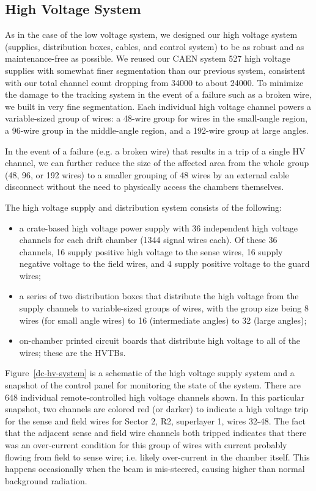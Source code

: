 \subsection{High Voltage System}

As in the case of the low voltage system, we designed our high voltage system
(supplies, distribution boxes, cables, and control system) to be as robust and 
as maintenance-free as possible.  
We reused our CAEN 
system 527 high voltage supplies with somewhat finer segmentation than our 
previous system, consistent with our total channel count dropping from 34000 
to about 24000.
To minimize the damage to the tracking system in the event of a failure such as
a broken wire, we built in very fine segmentation.
Each individual high voltage channel powers a variable-sized group of 
wires: a 48-wire group for wires in the small-angle region, a 96-wire group
in the middle-angle region, and a 192-wire group at large angles.

In the event of a failure (e.g. a broken wire) that results in a trip
of a single HV channel, we can further reduce the size of the affected
area from the whole group (48, 96, or 192 wires) to a smaller grouping
of 48 wires by an external cable disconnect without the need to 
physically access the chambers themselves.

The high voltage supply and distribution system consists of the following:
\begin{itemize}
\item a crate-based high voltage power supply with 36 independent
high voltage channels for each drift chamber (1344 signal wires each).
Of these 36 channels, 16 supply positive high voltage to the sense
wires, 16 supply negative voltage to the field wires, and 4 supply
positive voltage to the guard wires;
\item a series of two distribution boxes that distribute the high
voltage from the supply channels to variable-sized groups
of wires, with the group size being 8 wires (for small angle wires)
to 16 (intermediate angles) to 32 (large angles);
\item  on-chamber printed circuit boards that distribute high voltage
to all of the wires; these are the HVTBs.
\end{itemize}

Figure~\ref{dc-hv-system} is a schematic of the high voltage
supply system and a snapshot 
of the control panel for monitoring the state of the system.
There are 648 individual remote-controlled high voltage channels
shown.  In this particular snapshot, two channels are colored
red (or darker) to indicate a high voltage trip for the sense
and field wires for Sector 2, R2, superlayer 1, wires 32-48.
The fact that the adjacent sense and field wire channels both
tripped indicates that there was an over-current condition for
this group of wires with current probably flowing from field to
sense wire; i.e. likely over-current in the chamber itself.
This happens occasionally when the beam is mis-steered, causing
higher than normal background radiation.

